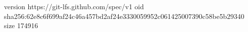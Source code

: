 version https://git-lfs.github.com/spec/v1
oid sha256:62e8c6f699af24c46a457bd2af24e3330059952c061425007390c58be5b29340
size 174916
